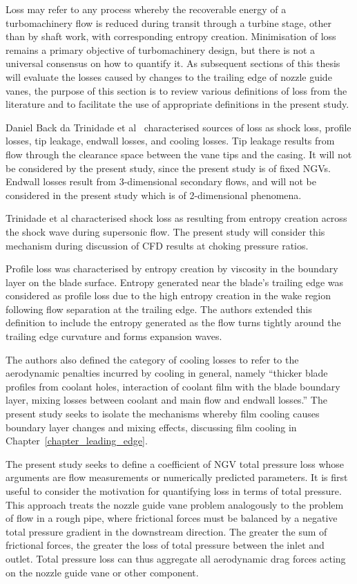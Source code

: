 \documentclass[a4paper, 11pt, oneside]{report}
\begin{document}
Loss may refer to any process whereby the recoverable energy of a turbomachinery flow is reduced during transit through a turbine stage, other than by shaft work, with corresponding entropy creation. Minimisation of loss remains a primary objective of turbomachinery design, but there is not a universal consensus on how to quantify it. As subsequent sections of this thesis will evaluate the losses caused by changes to the trailing edge of nozzle guide vanes, the purpose of this section is to review various definitions of loss from the literature and to facilitate the use of appropriate definitions in the present study.

Daniel Back da Trinidade et al~\cite{trinidade_loss} characterised sources of loss as shock loss, profile losses, tip leakage, endwall losses, and cooling losses. Tip leakage results from flow through the clearance space between the vane tips and the casing. It will not be considered by the present study, since the present study is of fixed NGVs. Endwall losses result from 3-dimensional secondary flows, and will not be considered in the present study which is of 2-dimensional phenomena.

Trinidade et al characterised shock loss as resulting from entropy creation across the shock wave during supersonic flow. The present study will consider this mechanism during discussion of CFD results at choking pressure ratios.

Profile loss was characterised by entropy creation by viscosity in the boundary layer on the blade surface. Entropy generated near the blade's trailing edge was considered as profile loss due to the high entropy creation in the wake region following flow separation at the trailing edge. The authors extended this definition to include the entropy generated as the flow turns tightly around the trailing edge curvature and forms expansion waves.

The authors also defined the category of cooling losses to refer to the aerodynamic penalties incurred by cooling in general, namely ``thicker blade profiles from coolant holes, interaction of coolant film with the blade boundary layer, mixing losses between coolant and main flow and endwall losses.'' The present study seeks to isolate the mechanisms whereby film cooling causes boundary layer changes and mixing effects, discussing film cooling in Chapter~\ref{chapter_leading_edge}.

The present study seeks to define a coefficient of NGV total pressure loss whose arguments are flow measurements or numerically predicted parameters. It is first useful to consider the motivation for quantifying loss in terms of total pressure. This approach treats the nozzle guide vane problem analogously to the problem of flow in a rough pipe, where frictional forces must be balanced by a negative total pressure gradient in the downstream direction. The greater the sum of frictional forces, the greater the loss of total pressure between the inlet and outlet. Total pressure loss can thus aggregate all aerodynamic drag forces acting on the nozzle guide vane or other component.
\end{document}
